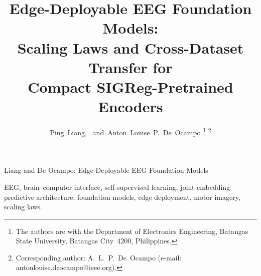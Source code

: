 \documentclass[journal,twoside,a4paper]{IEEEtran}
\begin{document}
\title{Edge-Deployable EEG Foundation Models: \\
       Scaling Laws and Cross-Dataset Transfer for \\
       Compact SIGReg-Pretrained Encoders}

\author{Ping~Liang,~
        and~Anton~Louise~P.~De~Ocampo%
        \thanks{The authors are with the Department of Electronics Engineering,
        Batangas State University, Batangas City~4200, Philippines.}%
        \thanks{Corresponding author: A.~L.~P.~De~Ocampo
        (e-mail: antonlouise.deocampo@ieee.org).}%
}

%
         {Liang and De Ocampo: Edge-Deployable EEG Foundation Models}

\maketitle



\begin{IEEEkeywords}
EEG, brain–computer interface, self-supervised learning, joint-embedding predictive
architecture, foundation models, edge deployment, motor imagery, scaling laws.
\end{IEEEkeywords}











\end{document}
